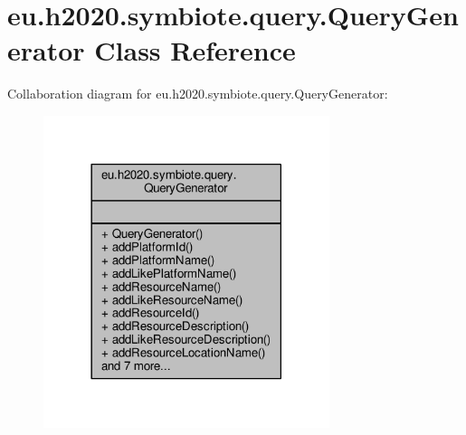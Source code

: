 \hypertarget{classeu_1_1h2020_1_1symbiote_1_1query_1_1QueryGenerator}{}\section{eu.\+h2020.\+symbiote.\+query.\+Query\+Generator Class Reference}
\label{classeu_1_1h2020_1_1symbiote_1_1query_1_1QueryGenerator}


Collaboration diagram for eu.\+h2020.\+symbiote.\+query.\+Query\+Generator\+:
\nopagebreak
\begin{figure}[H]
\begin{center}
\leavevmode
\includegraphics[width=237pt]{classeu_1_1h2020_1_1symbiote_1_1query_1_1QueryGenerator__coll__graph}
\end{center}
\end{figure}
